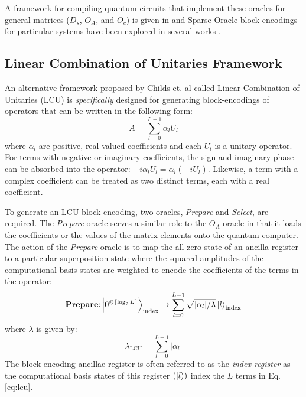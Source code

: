A framework for compiling quantum circuits that implement these oracles for general matrices ($D_s$, $O_A$, and $O_c$) is given in \cite{camps2024explicit, camps2022fable} and Sparse-Oracle block-encodings for particular systems have been explored in several works \cite{camps2022fable, liu2024efficient, sanavio2024explicit}.

\subsection{Linear Combination of Unitaries Framework}
\label{subsec:lcu}

An alternative framework proposed by Childs et. al \cite{childs2012hamiltonian} called Linear Combination of Unitaries (LCU) is \textit{specifically} designed for generating block-encodings of operators that can be written in the following form:
\begin{equation}
    \label{eq:lcu}
    A = \sum_{l=0}^{L-1} \alpha_l U_l
\end{equation}
where $\alpha_l$ are positive, real-valued coefficients and each $U_l$ is a unitary operator.
For terms with negative or imaginary coefficients, the sign and imaginary phase can be absorbed into the operator: $-i \alpha_l U_l = \alpha_l (-i U_l)$.
Likewise, a term with a complex coefficient can be treated as two distinct terms, each with a real coefficient.

To generate an LCU block-encoding, two oracles, \textit{Prepare} and \textit{Select}, are required. The \textit{Prepare} oracle serves a similar role to the $O_A$ oracle in that it loads the coefficients or the values of the matrix elements onto the quantum computer.
The action of the \textit{Prepare} oracle is to map the all-zero state of an ancilla register to a particular superposition state where the squared amplitudes of the computational basis states are weighted to encode the coefficients of the terms in the operator:
\begin{equation}
    \label{eq:prep-state}
    \textbf{Prepare}\text{:} \ket{0^{\otimes \lceil \log_2 L \rceil}}_\text{index} \rightarrow \sum_{l=0}^{L-1} \sqrt{| \alpha_l | / \lambda} \ket{l}_\text{index}
\end{equation}
where $\lambda$ is given by:
\begin{equation}
    \label{eq:lambda-lcu}
    \lambda_\text{LCU} = \sum_{l=0}^{L-1} | \alpha_l |
\end{equation}
The block-encoding ancillae register is often referred to as the \textit{index register} as the computational basis states of this register $(\ket{l})$ index the $L$ terms in Eq. \ref{eq:lcu}.


